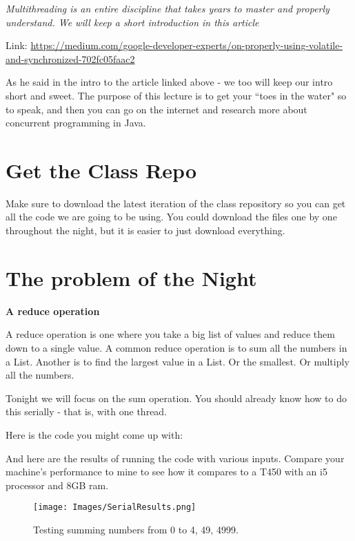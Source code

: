 \documentclass[12pt]{article}
\begin{document}
\textit{Multithreading is an entire discipline that takes years to master and
properly understand. We will keep a short introduction in this article}

Link:
\url{https://medium.com/google-developer-experts/on-properly-using-volatile-and-synchronized-702fc05faac2}

As he said in the intro to the article linked above - we too will keep our intro
short and sweet. The purpose of this lecture is to get your ``toes in the water"
so to speak, and then you can go on the internet and research more about
concurrent programming in Java. 

\section{Get the Class Repo}
Make sure to download the latest iteration of the class repository so you can
get all the code we are going to be using. You could download the files one by
one throughout the night, but it is easier to just download everything.

\section{The problem of the Night}
\label{problemStatement}

\begin{center}
\textbf{A reduce operation}
\end{center}

A reduce operation is one where you take a big list of values and reduce them
down to a single value. A common reduce operation is to sum all the numbers in a
List. Another is to find the largest value in a  List. Or the smallest. Or
multiply all the numbers.

Tonight we will focus on the sum operation. You should already know how to do
this serially - that is, with one thread.

Here is the code you might come up with:



And here are the results of running the code with various inputs. Compare your
machine's performance to mine to see how it compares to a T450 with an i5
processor and 8GB ram.

\begin{figure}[h]
  \label{serialresults}
  \centering
    \texttt{[image: Images/SerialResults.png]}
  \caption{Testing summing numbers from 0 to 4, 49, 4999.}
\end{figure}
\end{document}
